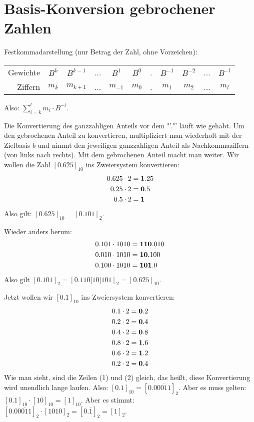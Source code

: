 \section{Basis-Konversion gebrochener Zahlen}

Festkommadarstellung (nur Betrag der Zahl, ohne Vorzeichen):
\begin{center}
	\begin{tabular}{rcccccccccc}
		Gewichte & $B^{k}$ & $B^{k-1}$ & ... & $B^1$ & $B^0$ & . & $B^{-1}$ & $B^{-2}$ & ... & $B^{-l}$ \\
		Ziffern & $m_k$ & $m_{k+1}$ & ... & $m_{-1}$ & $m_0$ & . & $m_{1}$ & $m_{2}$ & ... & $m_{l}$ \\
	\end{tabular}
\end{center}
Also: $\sum\limits_{i=k}^l m_i\cdot B^{-i}$.

Die Konvertierung des ganzzahligen Anteils vor dem "'."' läuft wie gehabt. Um den gebrochenen Anteil zu konvertieren, multipliziert man wiederholt mit der Zielbasis $b$ und nimmt den jeweiligen ganzzahligen Anteil als Nachkommaziffern (von links nach rechts). Mit dem gebrochenen Anteil macht man weiter. Wir wollen die Zahl $[0.625]_{10}$ ins Zweiersystem konvertieren:
\begin{align}
	0.625 \cdot 2 &= \textbf{1}.25 \notag \\
	0.25 \cdot 2 &= \textbf{0}.5 \notag \\
	0.5 \cdot 2 &= \textbf{1} \notag
\end{align}
Also gilt: $[0.625]_{10}=[0.101]_2$.

Wieder anders herum:
\begin{align}
	0.101 \cdot 1010 &= \textbf{110}.010 \notag \\
	0.010 \cdot 1010 &= \textbf{10}.100 \notag \\
	0.100 \cdot 1010 &= \textbf{101}.0 \notag
\end{align}
Also gilt $[0.101]_2 = [0.110|10|101]_2 = [0.625]_{10}$.

Jetzt wollen wir $[0.1]_{10}$ ins Zweiersystem konvertieren:
\begin{align}
	0.1 \cdot 2 &= \textbf{0}.2 \notag \\
	0.2 \cdot 2 &= \textbf{0}.4 \\
	0.4 \cdot 2 &= \textbf{0}.8 \notag \\
	0.8 \cdot 2 &= \textbf{1}.6 \notag \\
	0.6 \cdot 2 &= \textbf{1}.2 \notag \\
	0.2 \cdot 2 &= \textbf{0}.4
\end{align}
Wie man sieht, sind die Zeilen (1) und (2) gleich, das heißt, diese Konvertierung wird unendlich lange laufen. Also: $[0.1]_{10}=[0.0\overline{0011}]_2$. Aber es muss gelten: $[0.1]_{10}\cdot [10]_{10}=[1]_{10}$. Aber es stimmt: $[0.0\overline{0011}]_2\cdot [1010]_2=[0.\overline{1}]_2=[1]_2$.


